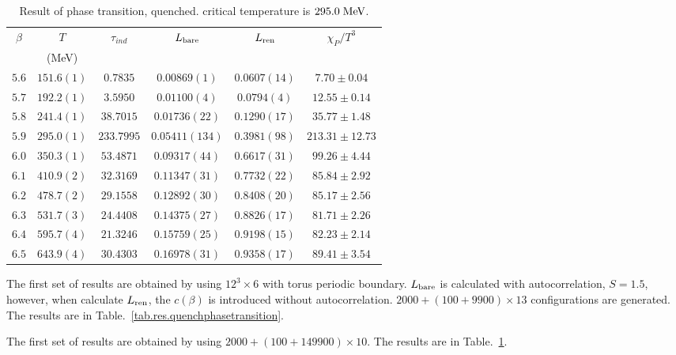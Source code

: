 \begin{table}
\begin{center}
\begin{tabular}{c|c|c|c|c|c}
    \hline    
$\beta$ & $T$ & $\tau _{ind}$ & $L_{\rm bare}$ & $L_{\rm ren}$ & $\chi _P/T^3$\\
& (MeV) & & & \\
\hline
$5.6$ & $151.6(1)$ & $  0.7835$ & $0.00869(1)$   & $0.0607(14)$ & $7.70\pm 0.04$ \\
\hline
$5.7$ & $192.2(1)$ & $  3.5950$ & $0.01100(4)$   & $0.0794(4)$  & $12.55\pm 0.14$ \\
\hline
$5.8$ & $241.4(1)$ & $ 38.7015$ & $0.01736(22)$  & $0.1290(17)$ & $35.77\pm 1.48$ \\
\hline
\textcolor[rgb]{0,0,1}{$5.9$} & $295.0(1)$ & $233.7995$ & $0.05411(134)$ & $0.3981(98)$ & \textcolor[rgb]{0,0,1}{$213.31\pm 12.73$} \\
\hline
$6.0$ & $350.3(1)$ & $ 53.4871$ & $0.09317(44)$  & $0.6617(31)$ & $99.26\pm 4.44$ \\ 
\hline
$6.1$ & $410.9(2)$ & $ 32.3169$ & $0.11347(31)$  & $0.7732(22)$ & $85.84\pm 2.92$ \\
\hline
$6.2$ & $478.7(2)$ & $ 29.1558$ & $0.12892(30)$  & $0.8408(20)$ & $85.17\pm 2.56$ \\
\hline
$6.3$ & $531.7(3)$ & $ 24.4408$ & $0.14375(27)$  & $0.8826(17)$ & $81.71\pm 2.26$ \\
\hline
$6.4$ & $595.7(4)$ & $ 21.3246$ & $0.15759(25)$  & $0.9198(15)$ & $82.23\pm 2.14$ \\
\hline
$6.5$ & $643.9(4)$ & $ 30.4303$ & $0.16978(31)$  & $0.9358(17)$ & $89.41\pm 3.54$ \\
\hline
\end{tabular}
\caption{\label{tab.res.quenchphasetransition2}Result of phase transition, quenched. critical temperature is $295.0\;{\rm MeV}$.}
\end{center}
\end{table}


The first set of results are obtained by using $12^3 \times 6$ with torus periodic boundary.
$L_{\rm bare}$ is calculated with autocorrelation, $S=1.5$, however, when calculate $L_{\rm ren}$, the $c(\beta)$ is introduced without autocorrelation.
$2000+(100+9900)\times 13$ configurations are generated.
The results are in Table.~\ref{tab.res.quenchphasetransition}.

The first set of results are obtained by using $2000+(100+149900)\times 10$.
The results are in Table.~\ref{tab.res.quenchphasetransition2}.
